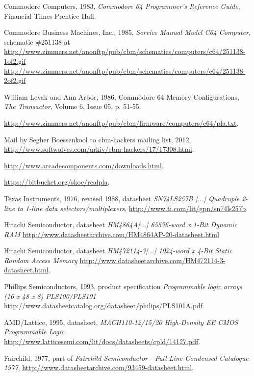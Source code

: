  Commodore Computers, 1983, \textit{Commodore 64
Programmer's Reference Guide}, Financial Times Prentice Hall.

 Commodore Business Machines, Inc., 1985,
\textit{Service Manual Model C64 Computer}, schematic \#251138 at
\url{http://www.zimmers.net/anonftp/pub/cbm/schematics/computers/c64/251138-1of2.gif}
\url{http://www.zimmers.net/anonftp/pub/cbm/schematics/computers/c64/251138-2of2.gif}

 William Levak and Ann Arbor, 1986, Commodore 64 Memory
Configurations, \textit{The Transactor}, Volume 6, Issue 05, p. 51-55.

\url{http://www.zimmers.net/anonftp/pub/cbm/firmware/computers/c64/pla.txt}.

 Mail by Segher Boessenkool to cbm-hackers mailing list, 2012,
\url{http://www.softwolves.com/arkiv/cbm-hackers/17/17308.html}.

 \url{http://www.arcadecomponents.com/downloads.html}.

 \url{https://bitbucket.org/skoe/realpla}.

 Texas Instruments, 1976, revised 1988, datasheet
\textit{SN74LS257B [...] Quadruple 2-line to 1-line data selectors/multiplexers},
\url{http://www.ti.com/lit/gpn/sn74ls257b}.

 Hitachi Semiconductor, datasheet
\textit{HM4864A[...] 65536-word x 1-Bit Dynamic RAM}
\url{http://www.datasheetarchive.com/HM4864AP-20-datasheet.html}

 Hitachi Semiconductor, datasheet
\textit{HM472114-3[...] 1024-word x 4-Bit Static Random Access Memory}
\url{http://www.datasheetarchive.com/HM472114-3-datasheet.html}.

 Phillips Semiconductors, 1993, product specification
\textit{Programmable logic arrays (16 x 48 x 8) PLS100/PLS101}
\url{http://www.datasheetcatalog.org/datasheet/philips/PLS101A.pdf}.

 AMD/Lattice, 1995, datasheet,
\textit{MACH110-12/15/20 High-Density EE CMOS Programmable Logic}
\url{http://www.latticesemi.com/lit/docs/datasheets/cpld/14127.pdf}.

 Fairchild, 1977, part of
\textit{Fairchild Semiconductor - Full Line Condensed Catalogue 1977},
\url{http://www.datasheetarchive.com/93459-datasheet.html}.

